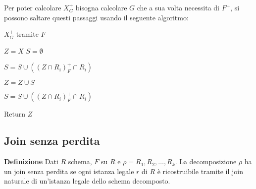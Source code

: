 \documentclass{article}
\begin{document}
\noindent Per poter calcolare $X_G^+$ bisogna calcolare $G$ che a sua volta necessita di $F^+$, si possono saltare questi passaggi usando il seguente algoritmo:

\begin{algorithm}[ht]
    \caption{$X_G^+$ tramite $F$}
    \begin{algorithmic}
        \State $Z=X$
        \State $S=\emptyset$

            \State $S=S\cup((Z\cap R_i)_F^+\cap R_i)$

        \EndFor


            \State $Z=Z\cup S$

    
                \State $S=S\cup((Z\cap R_i)_F^+\cap R_i)$
    
            \EndFor

        \EndWhile

    \State Return $Z$
        
    \end{algorithmic}
\end{algorithm}

\subsection{Join senza perdita}

\noindent\textbf{Definizione} Dati $R$ schema, $F$ su $R$ e $\rho=R_1,R_2,\ldots,R_k$. La decomposizione $\rho$ ha un join senza perdita se ogni istanza legale $r$ di $R$ è ricostruibile tramite il join naturale di un'istanza legale dello schema decomposto.
\end{document}
